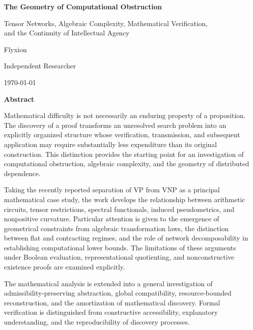\documentclass[11pt,letterpaper]{report}
\theoremstyle{plain}
\theoremstyle{definition}
\theoremstyle{remark}
\newcommand{\VP}{\mathrm{VP}}
\newcommand{\VNP}{\mathrm{VNP}}
\begin{document}
\thispagestyle{empty}
\begin{center}
{\LARGE\bfseries The Geometry of Computational Obstruction\par}
\vspace{0.8em}
{\large Tensor Networks, Algebraic Complexity, Mathematical Verification,\\
and the Continuity of Intellectual Agency\par}
\vspace{1.4em}
{\large Flyxion\par}
{\normalsize Independent Researcher\par}
\vspace{0.6em}
{\normalsize \today\par}
\end{center}
\vspace{1.6em}

\begin{center}{\bfseries Abstract}\end{center}
\begingroup\small\setlength{\parskip}{0.4em}
\noindent
Mathematical difficulty is not necessarily an enduring property of a proposition. The discovery of a proof transforms an unresolved search problem into an explicitly organized structure whose verification, transmission, and subsequent application may require substantially less expenditure than its original construction. This distinction provides the starting point for an investigation of computational obstruction, algebraic complexity, and the geometry of distributed dependence.

Taking the recently reported separation of $\VP$ from $\VNP$ as a principal mathematical case study, the work develops the relationship between arithmetic circuits, tensor restrictions, spectral functionals, induced pseudometrics, and nonpositive curvature. Particular attention is given to the emergence of geometrical constraints from algebraic transformation laws, the distinction between flat and contracting regimes, and the role of network decomposability in establishing computational lower bounds. The limitations of these arguments under Boolean evaluation, representational quotienting, and nonconstructive existence proofs are examined explicitly.

The mathematical analysis is extended into a general investigation of admissibility-preserving abstraction, global compatibility, resource-bounded reconstruction, and the amortization of mathematical discovery. Formal verification is distinguished from constructive accessibility, explanatory understanding, and the reproducibility of discovery processes.
\end{document}
